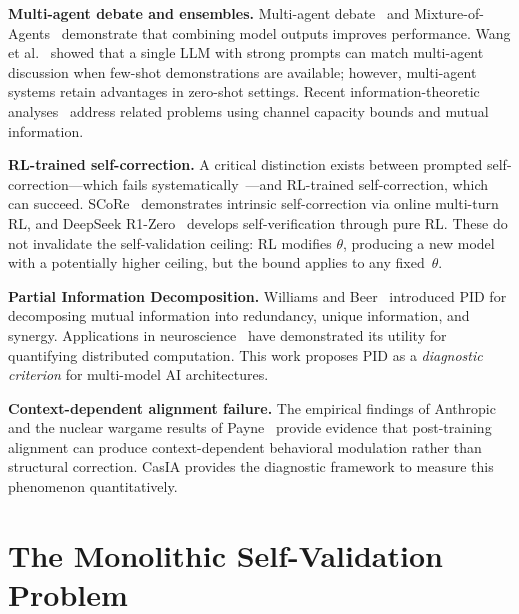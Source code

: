 \documentclass[11pt,a4paper]{article}
\theoremstyle{definition}
\begin{document}
\textbf{Multi-agent debate and ensembles.} Multi-agent debate~\cite{du2023debate,du2024debate,liang2024debate} and Mixture-of-Agents~\cite{wang2025moa} demonstrate that combining model outputs improves performance. Wang et al.~\cite{wang2024rethinking} showed that a single LLM with strong prompts can match multi-agent discussion when few-shot demonstrations are available; however, multi-agent systems retain advantages in zero-shot settings. Recent information-theoretic analyses~\cite{li2026agentscaling,zhang2026ensemble} address related problems using channel capacity bounds and mutual information.

\textbf{RL-trained self-correction.} A critical distinction exists between prompted self-correction---which fails systematically~\cite{huang2024selfcorrect,kamoi2024selfcorrect}---and RL-trained self-correction, which can succeed. SCoRe~\cite{kumar2025score} demonstrates intrinsic self-correction via online multi-turn RL, and DeepSeek R1-Zero~\cite{deepseek2025r1} develops self-verification through pure RL. These do not invalidate the self-validation ceiling: RL modifies $\theta$, producing a new model with a potentially higher ceiling, but the bound applies to any fixed~$\theta$.

\textbf{Partial Information Decomposition.} Williams and Beer~\cite{williams2010pid} introduced PID for decomposing mutual information into redundancy, unique information, and synergy. Applications in neuroscience~\cite{timme2014synergy} have demonstrated its utility for quantifying distributed computation. This work proposes PID as a \emph{diagnostic criterion} for multi-model AI architectures.

\textbf{Context-dependent alignment failure.} The empirical findings of Anthropic~\cite{anthropic2025alignment} and the nuclear wargame results of Payne~\cite{payne2026nuclear} provide evidence that post-training alignment can produce context-dependent behavioral modulation rather than structural correction. CasIA provides the diagnostic framework to measure this phenomenon quantitatively.


\section{The Monolithic Self-Validation Problem}
\label{sec:problem}
\end{document}
